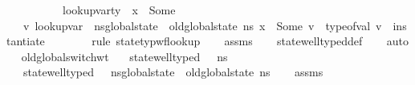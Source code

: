 \begin{isabellebody}
\ \ \ \ \ \ \ \ \ \ {\isachardoublequoteopen}lookup{\isacharunderscore}{\kern0pt}var{\isacharunderscore}{\kern0pt}ty\ {\isasymLambda}\ x\ {\isacharequal}{\kern0pt}\ Some\ {\isasymtau}{\isachardoublequoteclose}\ \ \ \ \ \ \ \ \ \ \isanewline
\ \ \ {\isachardoublequoteopen}{\isasymexists}v{\isachardot}{\kern0pt}\ lookup{\isacharunderscore}{\kern0pt}var\ {\isasymLambda}\ {\isacharparenleft}{\kern0pt}ns{\isasymlparr}global{\isacharunderscore}{\kern0pt}state\ {\isacharcolon}{\kern0pt}{\isacharequal}{\kern0pt}\ old{\isacharunderscore}{\kern0pt}global{\isacharunderscore}{\kern0pt}state\ ns{\isasymrparr}{\isacharparenright}{\kern0pt}\ x\ {\isacharequal}{\kern0pt}\ Some\ v\ {\isasymand}\ type{\isacharunderscore}{\kern0pt}of{\isacharunderscore}{\kern0pt}val\ v\ {\isacharequal}{\kern0pt}\ instantiate\ {\isasymOmega}\ {\isasymtau}{\isachardoublequoteclose}\ \ \isanewline
%
\isadelimproof
\ \ %
\endisadelimproof
%
\isatagproof
{}\isamarkupfalse%
\ {\isacharparenleft}{\kern0pt}rule\ state{\isacharunderscore}{\kern0pt}typ{\isacharunderscore}{\kern0pt}wf{\isacharunderscore}{\kern0pt}lookup{\isacharparenright}{\kern0pt}\isanewline
\ \ \isamarkupfalse%
\ assms\isanewline
\ \ \isamarkupfalse%
\ state{\isacharunderscore}{\kern0pt}well{\isacharunderscore}{\kern0pt}typed{\isacharunderscore}{\kern0pt}def\isanewline
\ \ \isamarkupfalse%
\ auto%
\endisatagproof
{\isafoldproof}%
%
\isadelimproof
\ \isanewline
%
\endisadelimproof
\isanewline
{}\isamarkupfalse%
\ old{\isacharunderscore}{\kern0pt}global{\isacharunderscore}{\kern0pt}switch{\isacharunderscore}{\kern0pt}wt{\isacharcolon}{\kern0pt}\isanewline
\ \ \ {\isachardoublequoteopen}state{\isacharunderscore}{\kern0pt}well{\isacharunderscore}{\kern0pt}typed\ {\isasymLambda}\ {\isasymOmega}\ n{\isacharunderscore}{\kern0pt}s{\isachardoublequoteclose}\isanewline
\ \ \ {\isachardoublequoteopen}state{\isacharunderscore}{\kern0pt}well{\isacharunderscore}{\kern0pt}typed\ {\isasymLambda}\ {\isasymOmega}\ {\isacharparenleft}{\kern0pt}n{\isacharunderscore}{\kern0pt}s{\isasymlparr}global{\isacharunderscore}{\kern0pt}state\ {\isacharcolon}{\kern0pt}{\isacharequal}{\kern0pt}\ old{\isacharunderscore}{\kern0pt}global{\isacharunderscore}{\kern0pt}state\ n{\isacharunderscore}{\kern0pt}s{\isasymrparr}{\isacharparenright}{\kern0pt}{\isachardoublequoteclose}\isanewline
%
\isadelimproof
\ \ %
\endisadelimproof
%
\isatagproof
{}\isamarkupfalse%
\ assms\isanewline
\ \ \isamarkupfalse%

\end{isabellebody}

